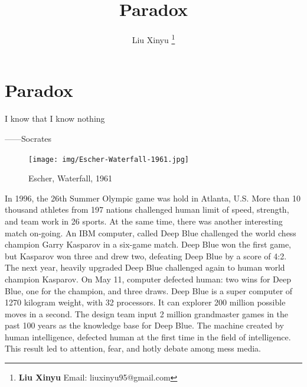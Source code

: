 \documentclass{article}
\begin{document}
\title{Paradox}

\author{Liu Xinyu
\thanks{{\bfseries Liu Xinyu} \newline
  Email: liuxinyu95@gmail.com \newline}
  }

\maketitle
\fi


\ifx\wholebook\relax
\chapter{Paradox}
\fi

\epigraph{I know that I know nothing}{——Socrates}

\begin{figure}
 \centering
 \texttt{[image: img/Escher-Waterfall-1961.jpg]}
 \captionsetup{labelformat=empty}
 \caption{Escher, Waterfall, 1961}
 \label{fig:Escher-Waterfall}
\end{figure}

In 1996, the 26th Summer Olympic game was hold in Atlanta, U.S. More than 10 thousand athletes from 197 nations challenged human limit of speed, strength, and team work in 26 sports. At the same time, there was another interesting match on-going. An IBM computer, called Deep Blue challenged the world chess champion Garry Kasparov in a six-game match. Deep Blue won the first game, but Kasparov won three and drew two, defeating Deep Blue by a score of 4:2. The next year, heavily upgraded Deep Blue challenged again to human world champion Kasparov. On May 11, computer defected human: two wins for Deep Blue, one for the champion, and three draws. Deep Blue is a super computer of 1270 kilogram weight, with 32 processors. It can explorer 200 million possible moves in a second. The design team input 2 million grandmaster games in the past 100 years as the knowledge base for Deep Blue. The machine created by human intelligence, defected human at the first time in the field of intelligence. This result led to attention, fear, and hotly debate among mess media.
\end{document}
